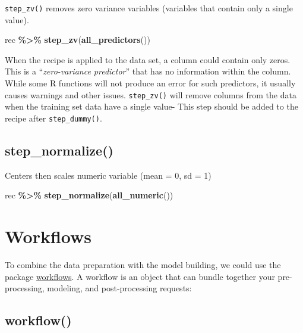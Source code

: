 \documentclass[
]{book}
\newenvironment{Shaded}{\begin{snugshade}}{\end{snugshade}}
\newcommand{\KeywordTok}[1]{\textcolor[rgb]{0.13,0.29,0.53}{\textbf{#1}}}
\newcommand{\NormalTok}[1]{#1}
\newcommand{\OperatorTok}[1]{\textcolor[rgb]{0.81,0.36,0.00}{\textbf{#1}}}
\newcommand{\StringTok}[1]{\textcolor[rgb]{0.31,0.60,0.02}{#1}}
\begin{document}
\texttt{step\_zv()} removes zero variance variables (variables that contain only a single value).

\begin{Shaded}
\begin{Highlighting}[]
\NormalTok{rec }\OperatorTok{\%\textgreater{}\%}
\StringTok{  }\KeywordTok{step\_zv}\NormalTok{(}\KeywordTok{all\_predictors}\NormalTok{())}
\end{Highlighting}
\end{Shaded}

When the recipe is applied to the data set, a column could contain only zeros. This is a ``\emph{zero-variance predictor}'' that has no information within the column. While some R functions will not produce an error for such predictors, it usually causes warnings and other issues. \texttt{step\_zv()} will remove columns from the data when the training set data have a single value- This step should be added to the recipe after \texttt{step\_dummy()}.

\hypertarget{step_normalize}{%
\section{step\_normalize()}\label{step_normalize}}

Centers then scales numeric variable (mean = 0, sd = 1)

\begin{Shaded}
\begin{Highlighting}[]
\NormalTok{rec }\OperatorTok{\%\textgreater{}\%}
\StringTok{  }\KeywordTok{step\_normalize}\NormalTok{(}\KeywordTok{all\_numeric}\NormalTok{())}
\end{Highlighting}
\end{Shaded}

\hypertarget{workflows}{%
\chapter{Workflows}\label{workflows}}

To combine the data preparation with the model building, we could use the package \href{https://workflows.tidymodels.org}{workflows}. A workflow is an object that can bundle together your pre-processing, modeling, and post-processing requests:

\hypertarget{workflow}{%
\section{workflow()}\label{workflow}}
\end{document}
